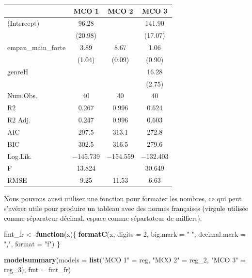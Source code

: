 \documentclass[
  11pt,
]{book}
\newenvironment{Shaded}{\begin{snugshade}}{\end{snugshade}}
\newcommand{\AttributeTok}[1]{\textcolor[rgb]{0.13,0.29,0.53}{#1}}
\newcommand{\ControlFlowTok}[1]{\textcolor[rgb]{0.13,0.29,0.53}{\textbf{#1}}}
\newcommand{\DecValTok}[1]{\textcolor[rgb]{0.00,0.00,0.81}{#1}}
\newcommand{\FunctionTok}[1]{\textcolor[rgb]{0.13,0.29,0.53}{\textbf{#1}}}
\newcommand{\NormalTok}[1]{#1}
\newcommand{\OtherTok}[1]{\textcolor[rgb]{0.56,0.35,0.01}{#1}}
\newcommand{\StringTok}[1]{\textcolor[rgb]{0.31,0.60,0.02}{#1}}
\numberwithin{equation}{section}
\numberwithin{countremarque}{section}
\begin{document}
\begin{table}[H]
\centering
\begin{tabular}[t]{lccc}
\toprule
  & MCO 1 & MCO 2 & MCO 3\\
\midrule
(Intercept) & \num{96.28} &  & \num{141.90}\\
 & (\num{20.98}) &  & (\num{17.07})\\
empan\_main\_forte & \num{3.89} & \num{8.67} & \num{1.06}\\
 & (\num{1.04}) & (\num{0.09}) & (\num{0.90})\\
genreH &  &  & \num{16.28}\\
 &  &  & (\num{2.75})\\
\midrule
Num.Obs. & \num{40} & \num{40} & \num{40}\\
R2 & \num{0.267} & \num{0.996} & \num{0.624}\\
R2 Adj. & \num{0.247} & \num{0.996} & \num{0.603}\\
AIC & \num{297.5} & \num{313.1} & \num{272.8}\\
BIC & \num{302.5} & \num{316.5} & \num{279.6}\\
Log.Lik. & \num{-145.739} & \num{-154.559} & \num{-132.403}\\
F & \num{13.824} &  & \num{30.649}\\
RMSE & \num{9.25} & \num{11.53} & \num{6.63}\\
\bottomrule
\end{tabular}
\end{table}

Nous pouvons aussi utiliser une fonction pour formater les nombres, ce qui peut s'avérer utile pour produire un tableau avec des normes françaises (virgule utilisée comme séparateur décimal, espace comme sépartateur de milliers).

\begin{Shaded}
\begin{Highlighting}[]
\NormalTok{fmt\_fr }\OtherTok{\textless{}{-}} \ControlFlowTok{function}\NormalTok{(x)\{}
  \FunctionTok{formatC}\NormalTok{(x, }\AttributeTok{digits =} \DecValTok{2}\NormalTok{, }\AttributeTok{big.mark =} \StringTok{" "}\NormalTok{, }\AttributeTok{decimal.mark =} \StringTok{","}\NormalTok{, }\AttributeTok{format =} \StringTok{"f"}\NormalTok{)}
\NormalTok{\}}
\end{Highlighting}
\end{Shaded}

\begin{Shaded}
\begin{Highlighting}[]
\FunctionTok{modelsummary}\NormalTok{(}\AttributeTok{models =} \FunctionTok{list}\NormalTok{(}\StringTok{"MCO 1"} \OtherTok{=}\NormalTok{ reg,}
                           \StringTok{"MCO 2"} \OtherTok{=}\NormalTok{ reg\_2,}
                           \StringTok{"MCO 3"} \OtherTok{=}\NormalTok{ reg\_3),}
             \AttributeTok{fmt =}\NormalTok{ fmt\_fr)}
\end{Highlighting}
\end{Shaded}
\end{document}
